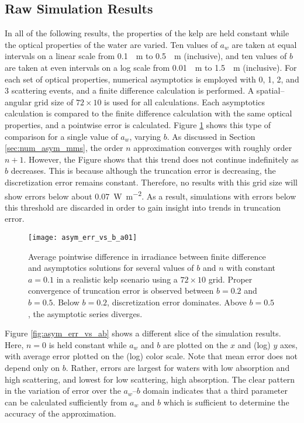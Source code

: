 \subsection{Raw Simulation Results}
\label{sec:iop_study_raw}
In all of the following results, the properties of the kelp are held constant while the optical properties of the water are varied.
Ten values of $a_w$ are taken at equal intervals on a linear scale from \SI{0.1}{\per\m} to \SI{0.5}{\per\m} (inclusive), and ten values of $b$ are taken at even intervals on a log scale from \SI{0.01}{\per\m} to \SI{1.5}{\per\m} (inclusive).
For each set of optical properties, numerical asymptotics is employed with 0, 1, 2, and 3 scattering events, and a finite difference calculation is performed.
A spatial--angular grid size of $72 \times 10$ is used for all calculations.
Each asymptotics calculation is compared to the finite difference calculation with the same optical properties, and a pointwise error is calculated.
Figure \ref{fig:asym_err_vs_b_a01} shows this type of comparison for a single value of $a_w$, varying $b$.
As discussed in Section \ref{sec:num_asym_mms}, the order $n$ approximation converges with roughly order $n+1$.
However, the Figure shows that this trend does not continue indefinitely as $b$ decreases.
This is because although the truncation error is decreasing, the discretization error remains constant.
Therefore, no results with this grid size will show errors below about \SI{0.07}{\W\per\m\squared}.
As a result, simulations with errors below this threshold are discarded in order to gain insight into trends in truncation error.

\newcommand\rdfigwidth{4.5in}

\begin{figure}[H]
  \centering
  \texttt{[image: asym\_err\_vs\_b\_a01]}
  \caption{Average pointwise difference in irradiance between finite difference and asymptotics solutions for several values of $b$ and $n$ with constant $a=0.1$ in a realistic kelp scenario using a $72\times 10$ grid. Proper convergence of truncation error is observed between $b=0.2$ and $b=0.5$. Below $b=0.2$, discretization error dominates. Above $b=0.5$, the asymptotic series diverges.}
  \label{fig:asym_err_vs_b_a01}
\end{figure}

Figure \ref{fig:asym_err_vs_ab} shows a different slice of the simulation results.
Here, $n=0$ is held constant while $a_w$ and $b$ are plotted on the $x$ and (log) $y$ axes, with average error plotted on the (log) color scale.
Note that mean error does not depend only on $b$.
Rather, errors are largest for waters with low absorption and high scattering, and lowest for low scattering, high absorption.
The clear pattern in the variation of error over the $a_w$--$b$ domain indicates that a third parameter can be calculated sufficiently from $a_w$ and $b$ which is sufficient to determine the accuracy of the approximation.

